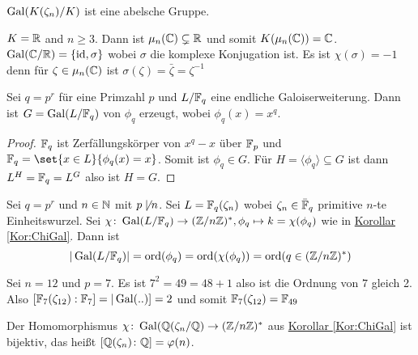 \begin{Kor}
    \(\operatorname{Gal}(K(\zeta_n)/K)\) ist eine abelsche Gruppe.
\end{Kor}
\begin{Bsp}
    \(K=\mathbb{R}\) and \(n\geq 3\). Dann ist \(\mu_n(\mathbb{C})\subsetneq\mathbb{R}\) und somit \(K(\mu_n(\mathbb{C}))=\mathbb{C}\).
    \(\operatorname{Gal}(\mathbb{C}/\mathbb{R})=\{\mathrm{id},\sigma\}\) wobei \(\sigma\) die komplexe Konjugation ist. Es ist \(\chi(\sigma)=-1\) denn
    für \(\zeta\in\mu_n(\mathbb{C})\) ist \(\sigma(\zeta)=\bar\zeta=\zeta^{-1}\)
\end{Bsp}
\begin{Satz}
    Sei \(q=p^r\) für eine Primzahl \(p\) und \(L/\mathbb{F}_q\) eine endliche Galoiserweiterung. Dann ist \(G=\operatorname{Gal}(L/\mathbb{F}_q)\) von \(\phi_q\) erzeugt, wobei \(\phi_q(x)=x^q\).
\end{Satz}
\begin{proof}
    \(\mathbb{F}_q\) ist Zerfällungskörper von \(x^q-x\) über \(\mathbb{F}_p\) und
    \(\FF_q=\set{x\in L}{ \phi_q(x)=x}\). Somit ist \(\phi_q\in G\).
    Für \(H=\langle \phi_q\rangle\subseteq G\) ist 
    dann \(L^H=\mathbb{F}_q=L^G\) also ist \(H=G\).
\end{proof}
\begin{Kor}
    Sei \(q=p^r\) und \(n\in\mathbb{N}\) mit \(p\not\mid n\). Sei \(L=\mathbb{F}_q(\zeta_n)\) wobei \(\zeta_n\in\bar {\mathbb{F}}_q\) primitive \(n\)-te Einheitswurzel.
    Sei \(\chi\colon \operatorname{Gal}(L/\mathbb{F}_q)\to (\mathbb{Z}/n\mathbb{Z})^*, \phi_q\mapsto k=\chi(\phi_q)\) wie in \hyperref[Kor:ChiGal]{Korollar} \ref{Kor:ChiGal}. Dann ist
    \[|\operatorname{Gal}(L/\mathbb{F}_q)|=\operatorname{ord}(\phi_q)=\operatorname{ord}(\chi(\phi_q))=\operatorname{ord}(q\in(\mathbb{Z}/n\mathbb{Z})^*)\]
\end{Kor}
\begin{Bsp}
  Sei \(n=12\) und \(p=7\). Es ist \(7^2=49 =48+1\) also ist die Ordnung von \(7\) gleich 2.
    Also \([\mathbb{F}_7(\zeta_{12}):\mathbb{F}_7]=|\operatorname{Gal}(..)]=2\) und somit \(\mathbb{F}_7(\zeta_{12})=\mathbb{F}_{49}\)
\end{Bsp}
\begin{Satz}
    Der Homomorphismus \(\chi\colon\operatorname{Gal}(\mathbb{Q}(\zeta_n/\mathbb{Q})\to(\mathbb{Z}/n\mathbb{Z})^*\) aus \hyperref[Kor:ChiGal]{Korollar \ref{Kor:ChiGal}} ist bijektiv, das heißt \([\mathbb{Q}(\zeta_n)\colon \mathbb{Q}]=\varphi(n)\).
\end{Satz}
